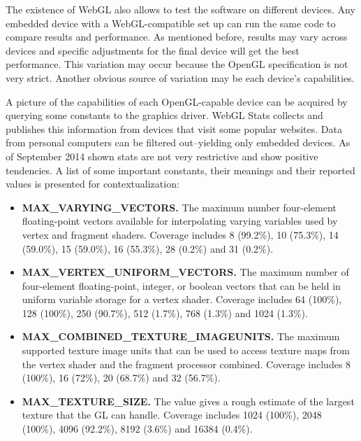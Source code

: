 \documentclass[conference]{IEEEtran}
\begin{document}
The existence of WebGL also allows to test the software on different devices. Any embedded device with a WebGL-compatible set up can run the same code to compare results and performance. As mentioned before, results may vary across devices and specific adjustments for the final device will get the best performance. This variation may occur because the OpenGL specification is not very strict. Another obvious source of variation may be each device's capabilities.

A picture of the capabilities of each OpenGL-capable device can be acquired by querying some constants to the graphics driver. WebGL Stats \cite{webglstats} collects and publishes this information from devices that visit some popular websites. Data from personal computers can be filtered out--yielding only embedded devices. As of September 2014 shown stats are not very restrictive and show positive tendencies. A list of some important constants, their meanings and their reported values is presented for contextualization:
\begin{itemize}
 \item {\footnotesize\bfseries MAX\_VARYING\_VECTORS.} The maximum number four-element floating-point vectors available for interpolating varying variables used by vertex and fragment shaders. Coverage includes 8 (99.2\%), 10 (75.3\%), 14 (59.0\%), 15 (59.0\%), 16 (55.3\%), 28 (0.2\%) and 31 (0.2\%).
 \item {\footnotesize\bfseries MAX\_VERTEX\_UNIFORM\_VECTORS.} The maximum number of four-element floating-point, integer, or boolean vectors that can be held in uniform variable storage for a vertex shader. Coverage includes 64 (100\%), 128 (100\%), 250 (90.7\%), 512 (1.7\%), 768 (1.3\%) and 1024 (1.3\%).
 \item {\footnotesize\bfseries MAX\_COMBINED\_TEXTURE\_IMAGEUNITS.} The maximum supported texture image units that can be used to access texture maps from the vertex shader and the fragment processor combined. Coverage includes 8 (100\%), 16 (72\%), 20 (68.7\%) and 32 (56.7\%).
 \item {\footnotesize\bfseries MAX\_TEXTURE\_SIZE.} The value gives a rough estimate of the largest texture that the GL can handle. Coverage includes 1024 (100\%), 2048 (100\%), 4096 (92.2\%), 8192 (3.6\%) and 16384 (0.4\%).
\end{itemize}
\end{document}
